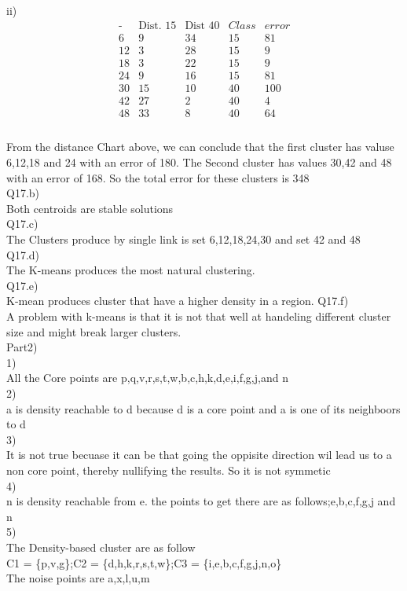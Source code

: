 \documentclass[12pt,english]{article}
\begin{document}
ii)\\
\begin{equation*}
\begin{array}{c|cccc}
\mbox{-}& \mbox{Dist. 15} & \mbox{Dist 40} & Class &  error\\
\hline
 6 &  9 & 34 & 15 &  81 \\
12 &  3 & 28 & 15 &   9 \\
18 &  3 & 22 & 15 &   9 \\
24 &  9 & 16 & 15 &  81 \\
30 & 15 & 10 & 40 & 100 \\
42 & 27 &  2 & 40 &   4 \\
48 & 33 &  8 & 40 &   64 \\
\end{array}
\end{equation*}\\
From the distance Chart above, we can conclude that the first cluster has valuse 6,12,18 and 24 with an error of 180. The Second cluster has values 30,42 and 48 with an error of 168. So the total error for these clusters is 348\\
Q17.b)\\
Both centroids are stable solutions\\
Q17.c)\\
The Clusters produce by single link is set 6,12,18,24,30 and set 42 and 48\\
Q17.d)\\
The K-means produces the most natural clustering.\\
Q17.e)\\
K-mean produces cluster that have a higher density in a region.
Q17.f)\\
A problem with k-means is that it is not that well at handeling different cluster size and might break larger clusters.\\
Part2)\\
1)\\
All the Core points are p,q,v,r,s,t,w,b,c,h,k,d,e,i,f,g,j,and n\\
2)\\
a is density reachable to d because d  is a core point and a is one of its neighboors to d\\
3)\\
It is not true becuase it can be that going the oppisite direction wil lead us to a non core point, thereby nullifying the results. So it is not symmetic\\
4)\\
n is density reachable from e. the points to get there are as follows;e,b,c,f,g,j and n\\
5)\\
 The Density-based cluster are as follow\\
C1 = \{p,v,g\};C2 = \{d,h,k,r,s,t,w\};C3 = \{i,e,b,c,f,g,j,n,o\}\\
The noise points are a,x,l,u,m
\end{document}
